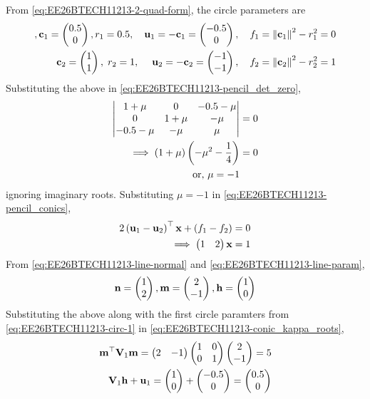 \begin{enumerate}[label=\thesubsection.\arabic*, ref=\thesubsection.\theenumi,itemsep=0pt]
\solution
From \eqref{eq:EE26BTECH11213-2-quad-form}, the circle parameters are
\begin{align}
\label{eq:EE26BTECH11213-circ-1}, 
 \mathbf{c}_1 = \begin{pmatrix}0.5 \\ 0\end{pmatrix},  r_1 = 0.5, 
 \quad \mathbf{u}_1 = -\mathbf{c}_1 = \begin{pmatrix}-0.5 \\ 0\end{pmatrix}, \quad f_1 = \left\lVert\mathbf{c}_1\right\rVert^2 - r_1^2 = 0 \\
 \mathbf{c}_2 = \begin{pmatrix}1 \\ 1\end{pmatrix}, \; r_2 = 1, \; 
 \quad \mathbf{u}_2 = -\mathbf{c}_2 = \begin{pmatrix}-1 \\ -1\end{pmatrix}, \quad f_2 = \left\lVert\mathbf{c}_2\right\rVert^2 - r_2^2 = 1
\end{align}
Substituting the above in 
\eqref{eq:EE26BTECH11213-pencil_det_zero}, 
\begin{align}
\begin{vmatrix}1 + \mu & 0 & -0.5 - \mu \\
0 & 1 + \mu & -\mu \\
-0.5 - \mu & -\mu & \mu\end{vmatrix} &= 0
\\
\implies \left(1 + \mu\right)\left(-\mu^2 - \frac{1}{4}\right) &= 0
\\
\text{or, }
\mu = -1
\end{align}
ignoring imaginary roots.
Substituting $\mu = -1$ in \eqref{eq:EE26BTECH11213-pencil_conics},
\begin{align}
2\left(\mathbf{u}_1 - \mathbf{u}_2\right)^\top \mathbf{x} + \left(f_1 - f_2\right) &= 0 \\
 \implies \begin{pmatrix}1 & 2\end{pmatrix}\mathbf{x} &= 1
\end{align}
From 
\eqref{eq:EE26BTECH11213-line-normal}
and
\eqref{eq:EE26BTECH11213-line-param},
\begin{align}
\mathbf{n} = \begin{pmatrix}1 \\ 2\end{pmatrix},
\mathbf{m} = \begin{pmatrix}2 \\ -1\end{pmatrix}, \mathbf{h} = \begin{pmatrix}1 \\ 0\end{pmatrix}
\end{align}
Substituting
the above 
along with the first circle paramters from
\eqref{eq:EE26BTECH11213-circ-1} 
in 
\eqref{eq:EE26BTECH11213-conic_kappa_roots},
\begin{align}
\vec{m}^\top \vec{V}_1 \vec{m} = \myvec{2 & -1}\myvec{1 & 0 \\ 0 & 1}\myvec{2 \\ -1} = 5 \\
\vec{V}_1 \vec{h} + \vec{u}_1 = \myvec{1 \\ 0} + \myvec{-0.5 \\ 0} = \myvec{0.5 \\ 0} \\

\end{align}
\end{enumerate}
